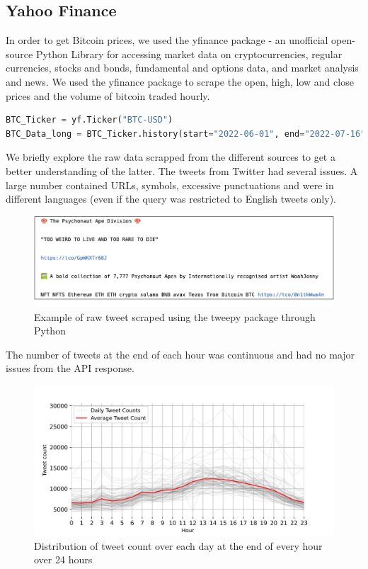 \subsection*{Yahoo Finance}
In order to get Bitcoin prices, we used the yfinance package - an unofficial open-source Python Library for accessing market data on cryptocurrencies, regular currencies, stocks and bonds, fundamental and options data, and market analysis and news. We used the yfinance package to scrape the open, high, low and close prices and the volume of bitcoin traded hourly.
\begin{lstlisting}[language=Python, caption= {yfinance query to get bitcoin price and traded volume within each hour between predefined start time and end time}, label = yfinance_search]
BTC_Ticker = yf.Ticker("BTC-USD")
BTC_Data_long = BTC_Ticker.history(start="2022-06-01", end="2022-07-16",interval= '1h')
\end{lstlisting}
\par We briefly explore the raw data scrapped from the different sources to get a better understanding of the latter. The tweets from Twitter had several issues. A large number contained URLs, symbols, excessive punctuations and were in different languages (even if the query was restricted to English tweets only).
\begin{figure}[H]
    \centering
    \includegraphics[scale=0.48]{CHAPTER_5/raw_tweet_example.png}
    \caption{Example of raw tweet scraped using the tweepy package through Python}
    \label{raw_tweet_example}
  \end{figure}
\noindent The number of tweets at the end of each hour was continuous and had no major issues from the API response.
\begin{figure}[H]
   \centering
   \includegraphics[scale=0.70]{CHAPTER_5/tweet_count_python.png}
   \caption{Distribution of tweet count over each day at the end of every hour over 24 hours}
   \label{tweet_count}
\end{figure}
